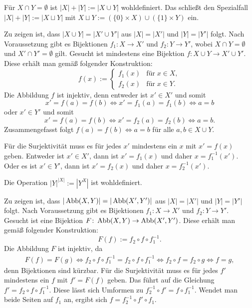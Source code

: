 \begin{Definition}\newlinefirst
Für $X\cap Y=\emptyset$ ist $|X|+|Y|:=|X\cup Y|$ wohldefiniert.
Das schließt den Spezialfall $|X|+|Y|:=|X\sqcup Y|$ mit
$X\sqcup Y:=(\{0\}\times X)\cup(\{1\}\times Y)$ ein.
\end{Definition}
\begin{Beweis}
Zu zeigen ist, dass $|X\cup Y|=|X'\cup Y'|$
aus $|X|=|X'|$ und $|Y|=|Y'|$ folgt. Nach Voraussetzung gibt
es Bijektionen $f_1\colon X\to X'$ und $f_2\colon Y\to Y'$, wobei
$X\cap Y=\emptyset$ und $X'\cap Y'=\emptyset$ gilt. Gesucht
ist mindestens eine Bijektion $f\colon X\cup Y\to X'\cup Y'$.
Diese erhält man gemäß folgender Konstruktion:
\[f(x):=\begin{cases}
f_1(x)&\text{für}\;x\in X,\\
f_2(x)&\text{für}\;x\in Y.
\end{cases}\]
Die Abbildung $f$ ist injektiv, denn entweder ist $x'\in X'$
und somit
\[x'=f(a)=f(b)\iff x'=f_1(a)=f_1(b)\iff a=b\]
oder $x'\in Y'$ und somit
\[x'=f(a)=f(b)\iff x'=f_2(a)=f_2(b)\iff a=b.\]
Zusammengefasst folgt $f(a)=f(b)\iff a=b$ für alle $a,b\in X\cup Y$.

Für die Surjektivität muss es für jedes $x'$ mindestens ein $x$ mit
$x'=f(x)$ geben. Entweder ist $x'\in X'$, dann ist $x'=f_1(x)$
und daher $x=f_1^{-1}(x')$. Oder es ist $x'\in Y'$, dann ist
$x'=f_2(x)$ und daher $x=f_2^{-1}(x')$.\;\qedsymbol
\end{Beweis}

\newpage
\begin{Definition}\newlinefirst
Die Operation $|Y|^{|X|}:=|Y^X|$ ist wohldefiniert.
\end{Definition}
\begin{Beweis}
Zu zeigen ist, dass $|\operatorname{Abb}(X,Y)|=|\operatorname{Abb}(X',Y')|$
aus $|X|=|X'|$ und $|Y|=|Y'|$ folgt. Nach Voraussetzung gibt
es Bijektionen $f_1\colon X\to X'$ und $f_2\colon Y\to Y'$.
Gesucht ist eine Bijektion $F\colon\operatorname{Abb}(X,Y)\to\operatorname{Abb}(X',Y')$.
Diese erhält man gemäß folgender Konstruktion:
\[F(f) := f_2\circ f\circ f_1^{-1}.\]
Die Abbildung $F$ ist injektiv, da
\begin{gather*}
F(f)=F(g) \iff f_2\circ f\circ f_1^{-1} = f_2\circ f\circ f_1^{-1}
\iff f_2\circ f = f_2\circ g\iff f=g,
\end{gather*}
denn Bijektionen sind kürzbar. Für die Surjektivität muss
es für jedes $f'$ mindestens ein $f$ mit $f'=F(f)$ geben.
Das führt auf die Gleichung $f'=f_2\circ f\circ f_1^{-1}$.
Diese lässt sich Umformen zu $f_2^{-1}\circ f'=f\circ f_1^{-1}$.
Wendet man beide Seiten auf $f_1$ an, ergibt sich
$f=f_2^{-1}\circ f'\circ f_1$.\;\qedsymbol
\end{Beweis}

